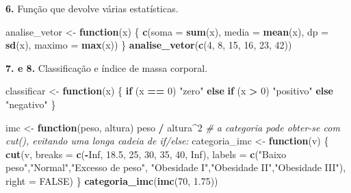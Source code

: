 \documentclass[
  portuguese,
  11pt,
  openany]{book}
\newenvironment{Shaded}{\begin{snugshade}}{\end{snugshade}}
\newcommand{\AttributeTok}[1]{\textcolor[rgb]{0.13,0.29,0.53}{#1}}
\newcommand{\CommentTok}[1]{\textcolor[rgb]{0.56,0.35,0.01}{\textit{#1}}}
\newcommand{\ConstantTok}[1]{\textcolor[rgb]{0.56,0.35,0.01}{#1}}
\newcommand{\ControlFlowTok}[1]{\textcolor[rgb]{0.13,0.29,0.53}{\textbf{#1}}}
\newcommand{\DecValTok}[1]{\textcolor[rgb]{0.00,0.00,0.81}{#1}}
\newcommand{\FloatTok}[1]{\textcolor[rgb]{0.00,0.00,0.81}{#1}}
\newcommand{\FunctionTok}[1]{\textcolor[rgb]{0.13,0.29,0.53}{\textbf{#1}}}
\newcommand{\NormalTok}[1]{#1}
\newcommand{\OtherTok}[1]{\textcolor[rgb]{0.56,0.35,0.01}{#1}}
\newcommand{\SpecialCharTok}[1]{\textcolor[rgb]{0.81,0.36,0.00}{\textbf{#1}}}
\newcommand{\StringTok}[1]{\textcolor[rgb]{0.31,0.60,0.02}{#1}}
\begin{document}
\textbf{6.} Função que devolve várias estatísticas.

\begin{Shaded}
\begin{Highlighting}[]
\NormalTok{analise\_vetor }\OtherTok{\textless{}{-}} \ControlFlowTok{function}\NormalTok{(x) \{}
  \FunctionTok{c}\NormalTok{(}\AttributeTok{soma =} \FunctionTok{sum}\NormalTok{(x), }\AttributeTok{media =} \FunctionTok{mean}\NormalTok{(x), }\AttributeTok{dp =} \FunctionTok{sd}\NormalTok{(x), }\AttributeTok{maximo =} \FunctionTok{max}\NormalTok{(x))}
\NormalTok{\}}
\FunctionTok{analise\_vetor}\NormalTok{(}\FunctionTok{c}\NormalTok{(}\DecValTok{4}\NormalTok{, }\DecValTok{8}\NormalTok{, }\DecValTok{15}\NormalTok{, }\DecValTok{16}\NormalTok{, }\DecValTok{23}\NormalTok{, }\DecValTok{42}\NormalTok{))}
\end{Highlighting}
\end{Shaded}

\textbf{7. e 8.} Classificação e índice de massa corporal.

\begin{Shaded}
\begin{Highlighting}[]
\NormalTok{classificar }\OtherTok{\textless{}{-}} \ControlFlowTok{function}\NormalTok{(x) \{}
  \ControlFlowTok{if}\NormalTok{ (x }\SpecialCharTok{==} \DecValTok{0}\NormalTok{) }\StringTok{"zero"} \ControlFlowTok{else} \ControlFlowTok{if}\NormalTok{ (x }\SpecialCharTok{\textgreater{}} \DecValTok{0}\NormalTok{) }\StringTok{"positivo"} \ControlFlowTok{else} \StringTok{"negativo"}
\NormalTok{\}}

\NormalTok{imc }\OtherTok{\textless{}{-}} \ControlFlowTok{function}\NormalTok{(peso, altura) peso }\SpecialCharTok{/}\NormalTok{ altura}\SpecialCharTok{\^{}}\DecValTok{2}
\CommentTok{\# a categoria pode obter{-}se com cut(), evitando uma longa cadeia de if/else:}
\NormalTok{categoria\_imc }\OtherTok{\textless{}{-}} \ControlFlowTok{function}\NormalTok{(v) \{}
  \FunctionTok{cut}\NormalTok{(v, }\AttributeTok{breaks =} \FunctionTok{c}\NormalTok{(}\SpecialCharTok{{-}}\ConstantTok{Inf}\NormalTok{, }\FloatTok{18.5}\NormalTok{, }\DecValTok{25}\NormalTok{, }\DecValTok{30}\NormalTok{, }\DecValTok{35}\NormalTok{, }\DecValTok{40}\NormalTok{, }\ConstantTok{Inf}\NormalTok{),}
      \AttributeTok{labels =} \FunctionTok{c}\NormalTok{(}\StringTok{"Baixo peso"}\NormalTok{,}\StringTok{"Normal"}\NormalTok{,}\StringTok{"Excesso de peso"}\NormalTok{,}
                 \StringTok{"Obesidade I"}\NormalTok{,}\StringTok{"Obesidade II"}\NormalTok{,}\StringTok{"Obesidade III"}\NormalTok{),}
      \AttributeTok{right =} \ConstantTok{FALSE}\NormalTok{)}
\NormalTok{\}}
\FunctionTok{categoria\_imc}\NormalTok{(}\FunctionTok{imc}\NormalTok{(}\DecValTok{70}\NormalTok{, }\FloatTok{1.75}\NormalTok{))}
\end{Highlighting}
\end{Shaded}
\end{document}
